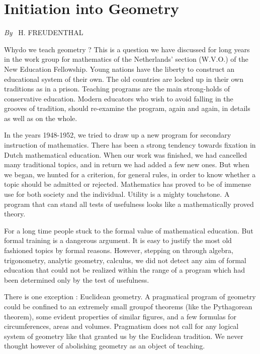 \chapter{Initiation into Geometry}

\begin{center}
{\em By}~ H. FREUDENTHAL
\end{center}

\setcounter{pageoriginal}{82}
Why\pageoriginale do we teach geometry ? This is a question we have discussed for long years in the work group for mathematics of the Netherlands' section (W.V.O.) of the New Education Fellowship. Young nations have the liberty to construct an educational system of their own. The old countries are locked up in their own traditions as in a prison. Teaching programs are the main strong-holds of conservative education. Modern educators who wish to avoid falling in the grooves of tradition, should re-examine the program, again and again, in details as well as on the whole.

\smallskip
In the years 1948-1952, we tried to draw up a new program for secondary instruction of mathematics. There has been a strong tendency towards fixation in Dutch mathematical education. When our work was finished, we had cancelled many traditional topics, and in return we had added a few new ones. But when we began, we hunted for a criterion, for general rules, in order to know whether a topic should be admitted or rejected. Mathematics has proved to be of immense use for both society and the individual. Utility is a mighty touchstone. A program that can stand all tests of usefulness looks like a mathematically proved theory.

\smallskip
For a long time people stuck to the formal value of mathematical education. But formal training is a dangerous argument. It is easy to justify the most old fashioned topics by formal reasons. However, stepping on through algebra, trigonometry, analytic geometry, calculus, we did not detect any aim of formal education that could not be realized within the range of a program which had been determined only by the test of usefulness.

\smallskip
There is one exception : Euclidean geometry. A pragmatical program of geometry could be confined to an extremely small group\pageoriginale of theorems (like the Pythagorean theorem), some evident properties of similar figures, and a few formulas for circumferences, areas and volumes. Pragmatism does not call for any logical system of geometry like that granted us by the Euclidean tradition. We never thought however of abolishing geometry as an object of teaching.

